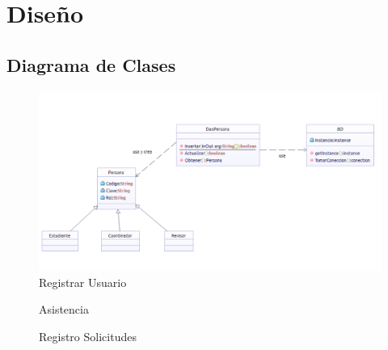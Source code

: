 \chapter{Diseño}





\section{Diagrama de Clases}

\begin{figure}[th!]
	\centering
	\includegraphics[width=1.2\linewidth]{uml/Clases/ClasesCrearUsuario}
	\caption{Registrar Usuario}
	\label{fig:Registrar Usuario}
\end{figure}

\newpage



\newpage

\begin{figure}[th!]
	\centering
	\caption{Asistencia}
	\label{fig:Asistencia}
\end{figure}

\newpage

\begin{figure}[th!]
	\centering
	\caption{Registro Solicitudes}
	\label{fig:Registro Solicitudes}
\end{figure}
